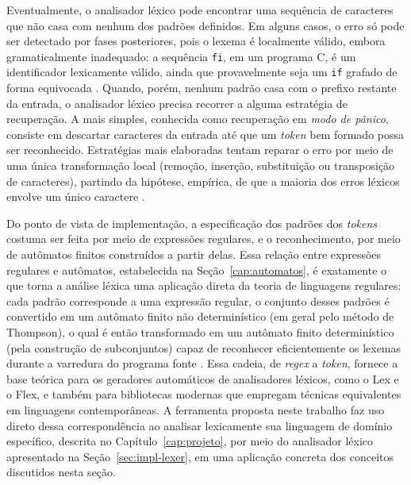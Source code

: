 \documentclass[
    12pt
    ,oneside
    ,a4paper
    ,chapter=TITLE
    ,section=TITLE
    ,sumario=abnt-6027-2012]{abntex2}
\begin{document}
Eventualmente, o analisador léxico pode encontrar uma sequência de caracteres que não casa com
nenhum dos padrões definidos. Em alguns casos, o erro só pode ser detectado por fases
posteriores, pois o lexema é localmente válido, embora gramaticalmente inadequado: a sequência
\texttt{fi}, em um programa C, é um identificador lexicamente válido, ainda que provavelmente
seja um \texttt{if} grafado de forma equivocada \cite{aho2008}. Quando, porém, nenhum padrão
casa com o prefixo restante da entrada, o analisador léxico precisa recorrer a alguma estratégia
de recuperação. A mais simples, conhecida como recuperação em \textit{modo de pânico}, consiste
em descartar caracteres da entrada até que um \textit{token} bem formado possa ser reconhecido.
Estratégias mais elaboradas tentam reparar o erro por meio de uma única transformação local
(remoção, inserção, substituição ou transposição de caracteres), partindo da hipótese, empírica,
de que a maioria dos erros léxicos envolve um único caractere \cite{aho2008}.

Do ponto de vista de implementação, a especificação dos padrões dos \textit{tokens} costuma ser
feita por meio de expressões regulares, e o reconhecimento, por meio de autômatos finitos
construídos a partir delas. Essa relação entre expressões regulares e autômatos, estabelecida na
Seção~\ref{cap:automatos}, é exatamente o que torna a análise léxica uma aplicação direta da
teoria de linguagens regulares: cada padrão corresponde a uma expressão regular, o conjunto
desses padrões é convertido em um autômato finito não determinístico (em geral pelo método de
Thompson), o qual é então transformado em um autômato finito determinístico (pela construção de
subconjuntos) capaz de reconhecer eficientemente os lexemas durante a varredura do programa
fonte \cite{aho2008}. Essa cadeia, de \textit{regex} a \textit{token}, fornece a base teórica
para os geradores automáticos de analisadores léxicos, como o Lex e o Flex, e também para
bibliotecas modernas que empregam técnicas equivalentes em linguagens contemporâneas. A
ferramenta proposta neste trabalho faz uso direto dessa correspondência ao analisar
lexicamente sua linguagem de domínio específico, descrita no Capítulo~\ref{cap:projeto},
por meio do analisador léxico apresentado na Seção~\ref{sec:impl-lexer}, em uma
aplicação concreta dos conceitos discutidos nesta seção.
\end{document}
